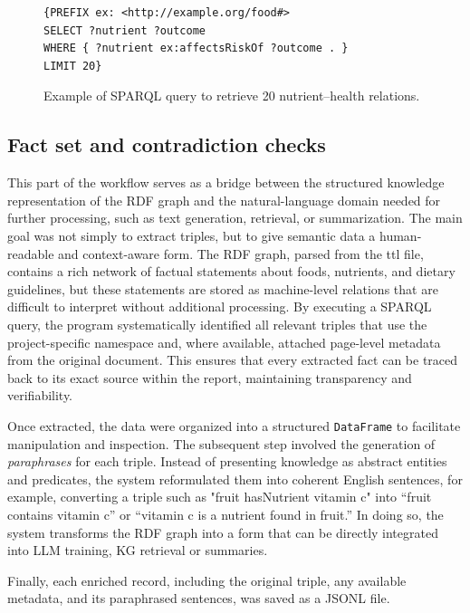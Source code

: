 \begin{figure}[h!]
\centering
\begin{lstlisting}
{PREFIX ex: <http://example.org/food#>
SELECT ?nutrient ?outcome
WHERE { ?nutrient ex:affectsRiskOf ?outcome . }
LIMIT 20}
\end{lstlisting}
\caption{Example of SPARQL query to retrieve 20 nutrient–health relations.}
\label{fig:query_example}
\end{figure}

 

\subsection{Fact set and contradiction checks}

This part of the workflow serves as a bridge between the structured knowledge representation of the RDF graph and the natural-language domain needed for further processing, such as text generation, retrieval, or summarization. The main goal was not simply to extract triples, but to give semantic data a human-readable and context-aware form. The RDF graph, parsed from the ttl file, contains a rich network of factual statements about foods, nutrients, and dietary guidelines, but these statements are stored as machine-level relations that are difficult to interpret without additional processing. By executing a SPARQL query, the program systematically identified all relevant triples that use the project-specific namespace and, where available, attached page-level metadata from the original document. This ensures that every extracted fact can be traced back to its exact source within the report, maintaining transparency and verifiability.

Once extracted, the data were organized into a structured \texttt{DataFrame} to facilitate manipulation and inspection. The subsequent step involved the generation of \textit{paraphrases} for each triple. Instead of presenting knowledge as abstract entities and predicates, the system reformulated them into coherent English sentences, for example, converting a triple such as "fruit hasNutrient vitamin c" into “fruit contains vitamin c” or “vitamin c is a nutrient found in fruit.” In doing so, the system transforms the RDF graph into a form that can be directly integrated into LLM training, KG retrieval or summaries.

Finally, each enriched record, including the original triple, any available metadata, and its paraphrased sentences, was saved as a JSONL file.

